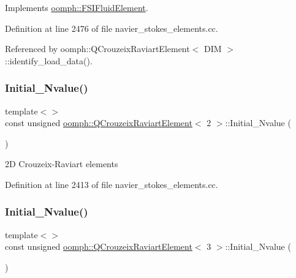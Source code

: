 Implements \hyperlink{classoomph_1_1FSIFluidElement_af8e0805b769b7d111eb71f223fc83df8}{oomph\+::\+F\+S\+I\+Fluid\+Element}.



Definition at line 2476 of file navier\+\_\+stokes\+\_\+elements.\+cc.



Referenced by oomph\+::\+Q\+Crouzeix\+Raviart\+Element$<$ D\+I\+M $>$\+::identify\+\_\+load\+\_\+data().

\mbox{\label{classoomph_1_1QCrouzeixRaviartElement_af4b3bbe0a23202e38a06918d32b95b6f}} 
\subsubsection{\texorpdfstring{Initial\+\_\+\+Nvalue()}{Initial\_Nvalue()}\hspace{0.1cm}{\footnotesize\ttfamily [1/2]}}
{\footnotesize\ttfamily template$<$$>$ \\
const unsigned \hyperlink{classoomph_1_1QCrouzeixRaviartElement}{oomph\+::\+Q\+Crouzeix\+Raviart\+Element}$<$ 2 $>$\+::Initial\+\_\+\+Nvalue (\begin{DoxyParamCaption}{ }\end{DoxyParamCaption})\hspace{0.3cm}{\ttfamily [private]}}



2D Crouzeix-\/\+Raviart elements 



Definition at line 2413 of file navier\+\_\+stokes\+\_\+elements.\+cc.

\mbox{\label{classoomph_1_1QCrouzeixRaviartElement_ae0a4b66b8274534987875619895d1ae3}} 
\subsubsection{\texorpdfstring{Initial\+\_\+\+Nvalue()}{Initial\_Nvalue()}\hspace{0.1cm}{\footnotesize\ttfamily [2/2]}}
{\footnotesize\ttfamily template$<$$>$ \\
const unsigned \hyperlink{classoomph_1_1QCrouzeixRaviartElement}{oomph\+::\+Q\+Crouzeix\+Raviart\+Element}$<$ 3 $>$\+::Initial\+\_\+\+Nvalue (\begin{DoxyParamCaption}{ }\end{DoxyParamCaption})\hspace{0.3cm}{\ttfamily [private]}}



